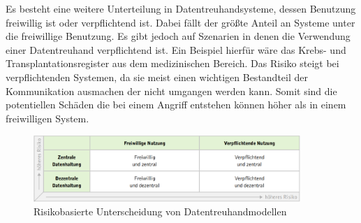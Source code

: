 \documentclass[11pt,a4paper]{scrreprt}
\begin{document}
Es besteht eine weitere Unterteilung in Datentreuhandsysteme, dessen Benutzung freiwillig ist oder verpflichtend ist. Dabei fällt der größte Anteil an Systeme unter die freiwillige Benutzung. Es gibt jedoch auf Szenarien in denen die Verwendung einer Datentreuhand verpflichtend ist. Ein Beispiel hierfür wäre das Krebs- und Transplantationsregister aus dem medizinischen Bereich. Das Risiko steigt bei verpflichtenden Systemen, da sie meist einen wichtigen Bestandteil der Kommunikation ausmachen der nicht umgangen werden kann. Somit sind die potentiellen Schäden die bei einem Angriff entstehen können höher als in einem freiwilligen System.

\begin{figure}
    \centering
    \includegraphics[width=0.9\textwidth]{DT-RisikoEinteilung.png}
    \caption{Risikobasierte Unterscheidung von Datentreuhandmodellen \cite{dt-blankertz2021neue}}
    \label{fig:dt-risikoeinteilug}
\end{figure}
\end{document}
